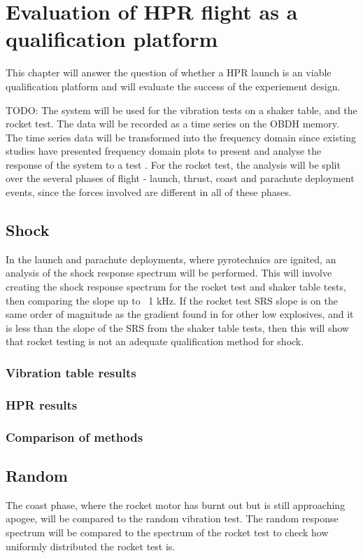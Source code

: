 \documentclass[]{report}
\begin{document}
\chapter{Evaluation of HPR flight as a qualification platform}

This chapter will answer the question of whether a HPR launch is an viable qualification platform and will evaluate the success of the experiement design.

TODO:
The system will be used for the vibration tests on a shaker table, and the rocket test. The data will be recorded as a time series on the OBDH memory. The time series data will be transformed into the frequency domain since existing studies have presented frequency domain plots to present and analyse the response of the system to a test \cite{nasa-pyroshock,nieto2019cubesat}. For the rocket test, the analysis will be split over the several phases of flight - launch, thrust, coast and parachute deployment events, since the forces involved are different in all of these phases.

\section{Shock}
In the launch and parachute deployments, where pyrotechnics are ignited, an analysis of the shock response spectrum will be performed. This will involve creating the shock response spectrum for the rocket test and shaker table tests, then comparing the slope up to ~1 kHz. If the rocket test SRS slope is on the same order of magnitude as the gradient found in \cite{wang2023numerical} for other low explosives, and it is less than the slope of the SRS from the shaker table tests, then this will show that rocket testing is not an adequate qualification method for shock.
\subsection{Vibration table results}
\subsection{HPR results}
\subsection{Comparison of methods}

\section{Random}
The coast phase, where the rocket motor has burnt out but is still approaching apogee, will be compared to the random vibration test. The random response spectrum will be compared to the spectrum of the rocket test to check how uniformly distributed the rocket test is.
\end{document}
